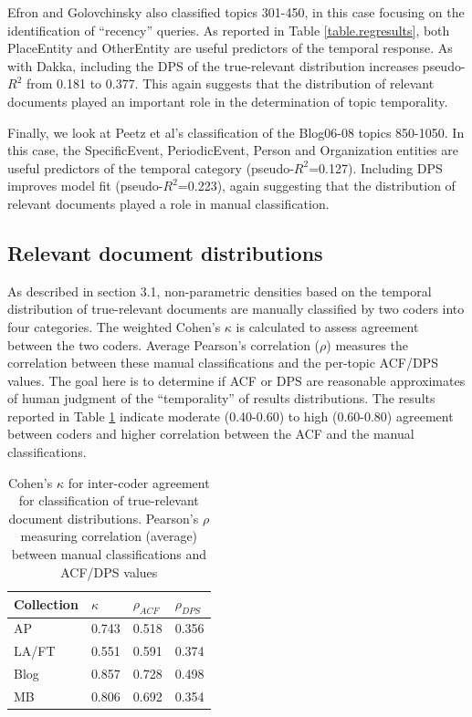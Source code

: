 \documentclass[runningheads,a4paper]{llncs}
\begin{document}
Efron and Golovchinsky also classified topics 301-450, in this case focusing on the identification of ``recency'' queries. As reported in Table \ref{table.regresults}, both PlaceEntity and OtherEntity are useful predictors of the temporal response. As with Dakka, including the DPS of the true-relevant distribution increases pseudo-$R^2$ from 0.181 to 0.377. This again suggests that the distribution of relevant documents played an important role in the determination of topic temporality.

Finally, we look at Peetz et al's classification of the Blog06-08 topics 850-1050. In this case, the SpecificEvent, PeriodicEvent, Person and Organization entities are useful predictors of the temporal category (pseudo-$R^2$=0.127). Including DPS  improves model fit (pseudo-$R^2$=0.223), again suggesting that the distribution of relevant documents played a role in manual classification.

\subsection{Relevant document distributions}

As described in section 3.1, non-parametric densities based on the temporal distribution of true-relevant documents are manually classified by two coders into four categories.  The weighted Cohen's $\kappa$ is calculated to assess agreement between the two coders.  Average Pearson's correlation ($\rho$) measures the correlation between these manual classifications and the per-topic ACF/DPS values.  The goal here is to determine if ACF or DPS are reasonable approximates of human judgment of the ``temporality'' of results distributions. The results reported in Table \ref{table.cor} indicate moderate (0.40-0.60) to high (0.60-0.80) agreement between coders and higher correlation between the ACF and the manual classifications.

\begin{table}
\small
\center
\begin{tabular}{| l | l | l | l | } \hline
\bf{Collection} & \bf{$\kappa$}  & \bf{$\rho_{ACF}$} & \bf{$\rho_{DPS}$} \\ \hline
AP 	   & 0.743 & 0.518 & 0.356 \\ \hline
LA/FT & 0.551 & 0.591 & 0.374 \\ \hline
Blog    & 0.857 & 0.728 & 0.498 \\ \hline
MB      & 0.806 & 0.692 & 0.354 \\ \hline 
\end{tabular}
\caption{Cohen's $\kappa$ for inter-coder agreement for classification of true-relevant document distributions. Pearson's $\rho$ measuring correlation (average) between manual classifications and ACF/DPS values}
\label{table.cor}
\end{table}
\end{document}
